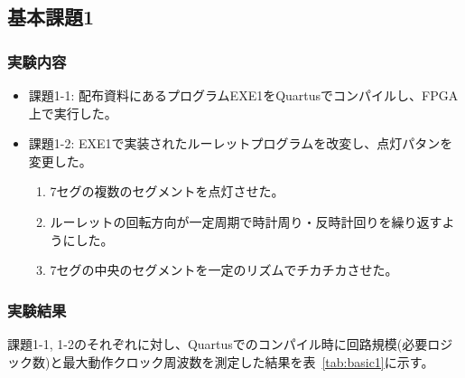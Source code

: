 \subsection{基本課題1}
\subsubsection{実験内容}
\begin{itemize}
    \item 課題1-1: 配布資料にあるプログラムEXE1をQuartusでコンパイルし、FPGA上で実行した。
    \item 課題1-2: EXE1で実装されたルーレットプログラムを改変し、点灯パタンを変更した。
    \begin{enumerate}
        \item 7セグの複数のセグメントを点灯させた。
        \item ルーレットの回転方向が一定周期で時計周り・反時計回りを繰り返すようにした。
        \item 7セグの中央のセグメントを一定のリズムでチカチカさせた。
    \end{enumerate}
\end{itemize}
\subsubsection{実験結果}
課題1-1, 1-2のそれぞれに対し、Quartusでのコンパイル時に回路規模(必要ロジック数)と最大動作クロック周波数を測定した結果を表~\ref{tab:basic1}に示す。

